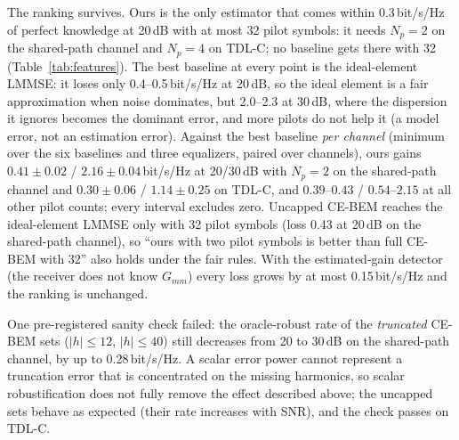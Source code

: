 The ranking survives. Ours is the only estimator that comes within 0.3\,bit/s/Hz of perfect knowledge at 20\,dB with
at most 32 pilot symbols: it needs $N_p=2$ on the shared-path channel and $N_p=4$ on TDL-C; no baseline gets there
with 32 (Table~\ref{tab:features}). The best baseline at every point is the ideal-element LMMSE: it loses only
0.4--0.5\,bit/s/Hz at 20\,dB, so the ideal element is a fair approximation when noise dominates, but 2.0--2.3 at
30\,dB, where the dispersion it ignores becomes the dominant error, and more pilots do not help it (a model error,
not an estimation error). Against the best baseline \emph{per channel} (minimum over the six baselines and three
equalizers, paired over channels), ours gains $0.41\pm0.02$ / $2.16\pm0.04$\,bit/s/Hz at 20/30\,dB with $N_p=2$ on the
shared-path channel and $0.30\pm0.06$ / $1.14\pm0.25$ on TDL-C, and $0.39$--$0.43$ / $0.54$--$2.15$ at all other pilot
counts; every interval excludes zero. Uncapped CE-BEM reaches the ideal-element LMMSE only with 32 pilot symbols
(loss 0.43 at 20\,dB on the shared-path channel), so ``ours with two pilot symbols is better than full CE-BEM with 32''
also holds under the fair rules. With the estimated-gain detector (the receiver does not know $G_{mm}$) every loss
grows by at most 0.15\,bit/s/Hz and the ranking is unchanged.

One pre-registered sanity check failed: the oracle-robust rate of the \emph{truncated} CE-BEM sets
($|h|\le12$, $|h|\le40$) still decreases from 20 to 30\,dB on the shared-path channel, by up to 0.28\,bit/s/Hz.
A scalar error power cannot represent a truncation error that is concentrated on the missing harmonics, so scalar
robustification does not fully remove the effect described above; the uncapped sets behave as expected (their rate
increases with SNR), and the check passes on TDL-C.

